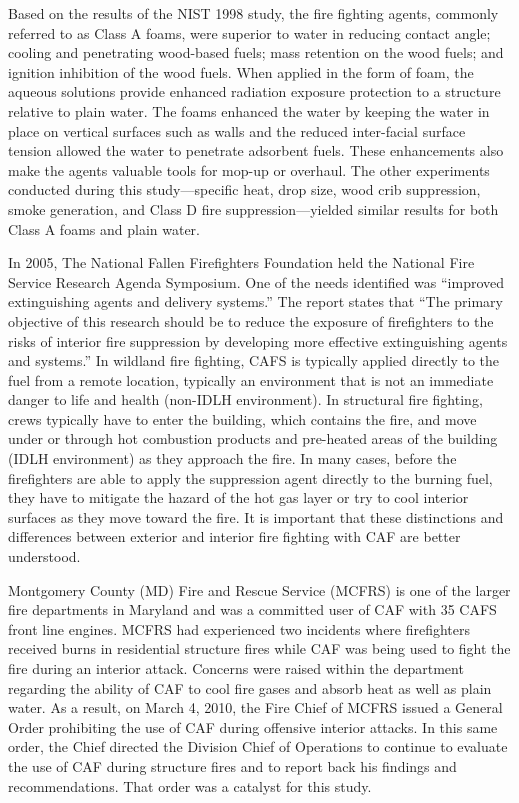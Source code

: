 \documentclass[12pt,oneside]{book}
\begin{document}
Based on the results of the NIST 1998 study, the fire fighting agents, commonly referred to as Class A foams, were superior to water in reducing contact angle; cooling and penetrating wood-based fuels; mass retention on the wood fuels; and ignition inhibition of the wood fuels.  When applied in the form of foam, the aqueous solutions provide enhanced radiation exposure protection to a structure relative to plain water. The foams enhanced the water by keeping the water in place on vertical surfaces such as walls and the reduced inter-facial surface tension allowed the water to penetrate adsorbent fuels. These enhancements also make the agents valuable tools for mop-up or overhaul. The other experiments conducted during this study---specific heat, drop size, wood crib suppression, smoke generation, and Class D fire suppression---yielded similar results for both Class A foams and plain water.

In 2005, The National Fallen Firefighters Foundation held the National Fire Service Research Agenda Symposium.  One of the needs identified was ``improved extinguishing agents and delivery systems.'' The report states that ``The primary objective of this research should be to reduce the exposure of firefighters to the risks of interior fire suppression by developing more effective extinguishing agents and systems.'' In wildland fire fighting, CAFS is typically applied directly to the fuel from a remote location, typically an environment that is not an immediate danger to life and health (non-IDLH environment). In structural fire fighting, crews typically have to enter the building, which contains the fire, and move under or through hot combustion products and pre-heated areas of the building (IDLH environment) as they approach the fire. In many cases, before the firefighters are able to apply the suppression agent directly to the burning fuel, they have to mitigate the hazard of the hot gas layer or try to cool interior surfaces as they move toward the fire. It is important that these distinctions and differences between exterior and interior fire fighting with CAF are better understood.

Montgomery County (MD) Fire and Rescue Service (MCFRS) is one of the larger fire departments in Maryland and was a committed user of CAF with 35 CAFS front line engines. MCFRS had experienced two incidents where firefighters received burns in residential structure fires while CAF was being used to fight the fire during an interior attack. Concerns were raised within the department regarding the ability of CAF to cool fire gases and absorb heat as well as plain water. As a result, on March 4, 2010, the Fire Chief of MCFRS issued a General Order prohibiting the use of CAF during offensive interior attacks. In this same order, the Chief directed the Division Chief of Operations to continue to evaluate the use of CAF during structure fires and to report back his findings and recommendations. That order was a catalyst for this study.
\end{document}
